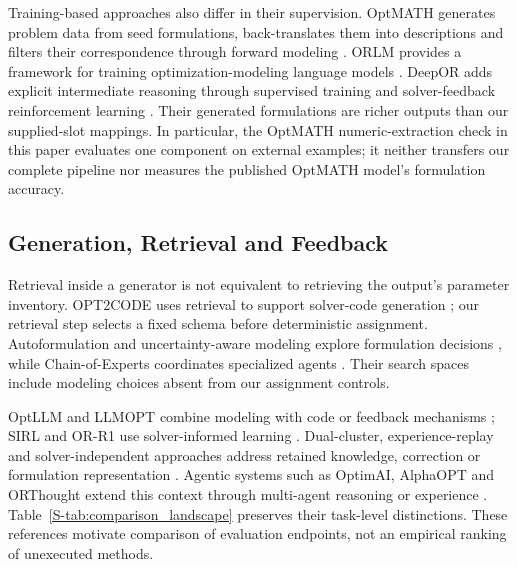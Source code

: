 \documentclass[pdflatex,iicol,sn-basic,Numbered]{sn-jnl}
\begin{document}
Training-based approaches also differ in their supervision. OptMATH generates problem data from seed formulations, back-translates them into descriptions and filters their correspondence through forward modeling \cite{lu2025optmath}. ORLM provides a framework for training optimization-modeling language models \cite{huang2025orlm}. DeepOR adds explicit intermediate reasoning through supervised training and solver-feedback reinforcement learning \cite{xiao2026deepor}. Their generated formulations are richer outputs than our supplied-slot mappings. In particular, the OptMATH numeric-extraction check in this paper evaluates one component on external examples; it neither transfers our complete pipeline nor measures the published OptMATH model's formulation accuracy.

\subsection{Generation, Retrieval and Feedback}
\label{subsec:rw_retrieval_memory}
Retrieval inside a generator is not equivalent to retrieving the output's parameter inventory. OPT2CODE uses retrieval to support solver-code generation \cite{ahmed2025opt2code}; our retrieval step selects a fixed schema before deterministic assignment. Autoformulation and uncertainty-aware modeling explore formulation decisions \cite{astorga2025autoformulation,yu2026uncertainty}, while Chain-of-Experts coordinates specialized agents \cite{xiao2024chainofexperts}. Their search spaces include modeling choices absent from our assignment controls.

OptLLM and LLMOPT combine modeling with code or feedback mechanisms \cite{zhang2024optllm,jiang2025llmopt}; SIRL and OR-R1 use solver-informed learning \cite{chen2025solver,ding2026orr1}. Dual-cluster, experience-replay and solver-independent approaches address retained knowledge, correction or formulation representation \cite{zhang2026dual,xie2026escaping,li2026solver}. Agentic systems such as OptimAI, AlphaOPT and ORThought extend this context through multi-agent reasoning or experience \cite{thind2025optimai,kong2025alphaopt,yang2026orthought}. Table~\ref{S-tab:comparison_landscape} preserves their task-level distinctions. These references motivate comparison of evaluation endpoints, not an empirical ranking of unexecuted methods.
\end{document}
